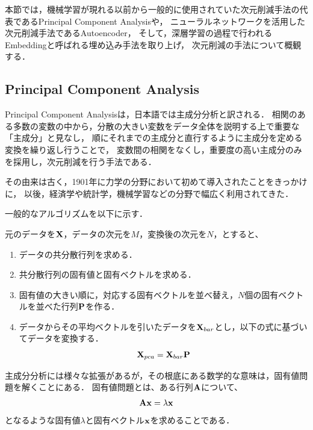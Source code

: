 本節では，機械学習が現れる以前から一般的に使用されていた次元削減手法の代表であるPrincipal Component Analysisや，
ニューラルネットワークを活用した次元削減手法であるAutoencoder，
そして，深層学習の過程で行われるEmbeddingと呼ばれる埋め込み手法を取り上げ，
次元削減の手法について概観する．

\subsection{Principal Component Analysis}
Principal Component Analysisは，日本語では主成分分析と訳される．
相関のある多数の変数の中から，分散の大きい変数をデータ全体を説明する上で重要な「主成分」と見なし，
順にそれまでの主成分と直行するように主成分を定める変換を繰り返し行うことで，
変数間の相関をなくし，重要度の高い主成分のみを採用し，次元削減を行う手法である．

その由来は古く，1901年に力学の分野において初めて導入された\cite{pearson1901liii}ことをきっかけに，
以後，経済学や統計学，機械学習などの分野で幅広く利用されてきた\cite{wold1987principal,ku1995disturbance}．

一般的なアルゴリズムを以下に示す．

元のデータを${\bf X}$，データの次元を$M$，変換後の次元を$N$，とすると、
\begin{enumerate}
	\item データの共分散行列を求める． 
	\item 共分散行列の固有値と固有ベクトルを求める． 
	\item 固有値の大きい順に，対応する固有ベクトルを並べ替え，$N$個の固有ベクトルを並べた行列${\bf P}$を作る． 
	\item データからその平均ベクトルを引いたデータを${\bf X}_{bar}$とし，以下の式に基づいてデータを変換する． 
	\begin{equation}
		{\bf X}_{pca} = {\bf X}_{bar} {\bf P}
	\end{equation}
\end{enumerate}

主成分分析には様々な拡張がある\cite{scholkopf1997kernel,tipping1999probabilistic}が，その根底にある数学的な意味は，固有値問題を解くことにある．
固有値問題とは、ある行列${\bf A}$について、
\begin{equation} 
{\bf A} {\bf x} = \lambda {\bf x}
\end{equation} 
となるような固有値$\lambda$と固有ベクトル${\bf x}$を求めることである．




